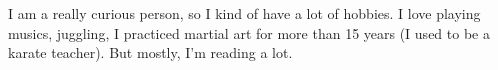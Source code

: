 

\begin{cvparagraph}

I am a really curious person, so I kind of have a lot of hobbies.
I love playing musics, juggling, I practiced martial art for more than 15 years (I used to be a karate teacher).
But mostly, I'm reading a lot.

\end{cvparagraph}
